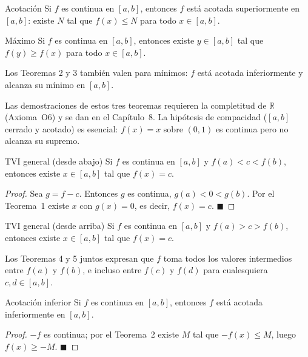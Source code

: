 \documentclass[12pt]{article}
\begin{document}
\begin{teorema}[2]{Acotación}
Si $f$ es continua en $[a, b]$, entonces $f$ está acotada superiormente en $[a, b]$: existe $N$ tal que $f(x) \leq N$ para todo $x \in [a, b]$.
\end{teorema}

\begin{teorema}[3]{Máximo}
Si $f$ es continua en $[a, b]$, entonces existe $y \in [a, b]$ tal que $f(y) \geq f(x)$ para todo $x \in [a, b]$.
\end{teorema}

\begin{nota}[]{}
Los Teoremas 2 y 3 también valen para mínimos: $f$ está acotada inferiormente y alcanza su mínimo en $[a, b]$.

Las demostraciones de estos tres teoremas requieren la completitud de $\mathbb{R}$ (Axioma~O6) y se dan en el Capítulo~8. La hipótesis de compacidad ($[a,b]$ cerrado y acotado) es esencial: $f(x) = x$ sobre $(0,1)$ es continua pero no alcanza su supremo.
\end{nota}

\begin{teorema}[4]{TVI general (desde abajo)}
Si $f$ es continua en $[a, b]$ y $f(a) < c < f(b)$, entonces existe $x \in [a, b]$ tal que $f(x) = c$.
\end{teorema}

\begin{proof}
Sea $g = f - c$. Entonces $g$ es continua, $g(a) < 0 < g(b)$. Por el Teorema~1 existe $x$ con $g(x) = 0$, es decir, $f(x) = c$.
$\blacksquare$
\end{proof}

\begin{teorema}[5]{TVI general (desde arriba)}
Si $f$ es continua en $[a, b]$ y $f(a) > c > f(b)$, entonces existe $x \in [a, b]$ tal que $f(x) = c$.
\end{teorema}

\begin{nota}[]{}
Los Teoremas 4 y 5 juntos expresan que $f$ toma todos los valores intermedios entre $f(a)$ y $f(b)$, e incluso entre $f(c)$ y $f(d)$ para cualesquiera $c, d \in [a, b]$.
\end{nota}

\begin{teorema}[6]{Acotación inferior}
Si $f$ es continua en $[a, b]$, entonces $f$ está acotada inferiormente en $[a, b]$.
\end{teorema}

\begin{proof}
$-f$ es continua; por el Teorema~2 existe $M$ tal que $-f(x) \leq M$, luego $f(x) \geq -M$.
$\blacksquare$
\end{proof}
\end{document}
